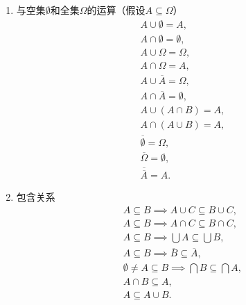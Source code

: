 \begin{property}
\begin{enumerate}
\item 与空集\(\emptyset\)和全集\(\Omega\)的运算（假设\(A \subseteq \Omega\)）
\begin{gather}
	A \cup \emptyset = A, \label{equation:集合论.集合代数公式5-1} \\
	A \cap \emptyset = \emptyset, \label{equation:集合论.集合代数公式5-2} \\
	A \cup \Omega = \Omega, \label{equation:集合论.集合代数公式5-3} \\
	A \cap \Omega = A, \label{equation:集合论.集合代数公式5-4} \\
	A \cup \overline{A} = \Omega, \label{equation:集合论.集合代数公式5-5} \\
	A \cap \overline{A} = \emptyset, \label{equation:集合论.集合代数公式5-6} \\
	A \cup (A \cap B) = A, \\
	A \cap (A \cup B) = A, \\
	\overline{\emptyset} = \Omega, \\
	\overline{\Omega} = \emptyset, \\
	\overline{\overline{A}} = A.
\end{gather}

\item 包含关系
\begin{gather}
	A \subseteq B \implies A \cup C \subseteq B \cup C, \label{equation:集合论.集合代数公式6-1} \\
	A \subseteq B \implies A \cap C \subseteq B \cap C, \label{equation:集合论.集合代数公式6-2} \\
	A \subseteq B \implies \bigcup A \subseteq \bigcup B, \label{equation:集合论.集合代数公式6-3} \\
	A \subseteq B \implies \overline{B} \subseteq \overline{A}, \label{equation:集合论.集合代数公式6-4} \\
	\emptyset \neq A \subseteq B \implies \bigcap B \subseteq \bigcap A, \label{equation:集合论.集合代数公式6-5} \\
	A \cap B \subseteq A, \\
	A \subseteq A \cup B.
\end{gather}


\end{enumerate}
\end{property}
